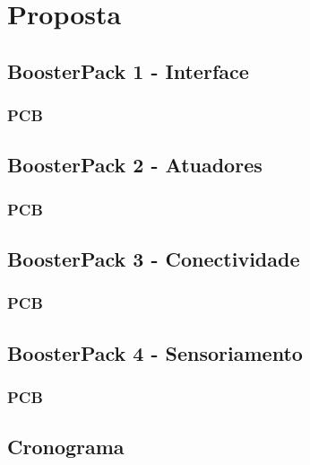 \chapter[Proposta]{Proposta}




\section{BoosterPack 1 - Interface}
\label{sec:interface}



\subsection{PCB}



\section{BoosterPack 2 - Atuadores}
\label{sec:atuadores}


\subsection{PCB}

\section{BoosterPack 3 - Conectividade}

\subsection{PCB}

\section{BoosterPack 4 - Sensoriamento}

\subsection{PCB}

\section{Cronograma}